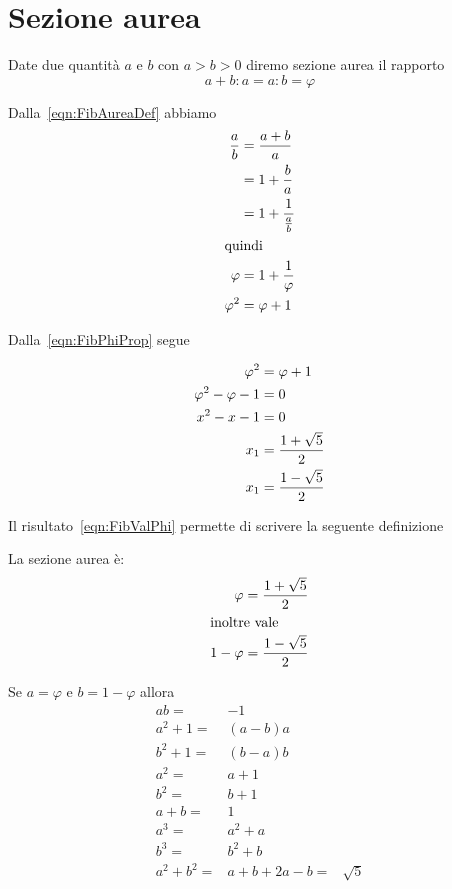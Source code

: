 \section{Sezione aurea}
\begin{defn}
	Date due quantità $a$ e $b$ con $a>b>0$ diremo sezione aurea il rapporto
	\begin{equation}
	a+b:a=a:b=\varphi	
	\end{equation}\label{eqn:FibAureaDef}
\end{defn}
\begin{prop}
	Dalla~\vref{eqn:FibAureaDef} abbiamo
	\begin{align}
		\dfrac{a}{b}={}&\dfrac{a+b}{a}\notag\\
		={}&1+\dfrac{b}{a}\notag\\
		={}&1+\dfrac{1}{\frac{a}{b}}\notag\\
		\intertext{quindi}
		\varphi={}&1+\dfrac{1}{\varphi}\label{eqn:FibPhiProp}\\
		\varphi^2={}&\varphi+1\notag
	\end{align}
\end{prop}
	Dalla~\vref{eqn:FibPhiProp} segue
	\begin{prop}
	\begin{align}
		\varphi^2={}&\varphi+1\notag\\
		\varphi^2-\varphi-1={}&0\notag\\
		x^2-x-1={}&0\label{eqn:FibValPhiEqua}\\
		x_1={}&\dfrac{1+\sqrt{5}}{2}\label{eqn:FibValPhi}\\
		x_1={}&\dfrac{1-\sqrt{5}}{2}\notag
	\end{align}
\end{prop}
Il risultato~\ref{eqn:FibValPhi} permette di scrivere la seguente definizione
\begin{defn}
La sezione aurea è: 
\begin{align*}
	\varphi={}&\dfrac{1+\sqrt{5}}{2}\\
\intertext{inoltre vale}
	1-	\varphi={}&\dfrac{1-\sqrt{5}}{2}\\
\end{align*}
\end{defn}
\begin{lem}[Proprietà]\label{lem:FibpropPhi}
	Se $a=\varphi$ e  $b=1-\varphi$ allora
	\begin{align*}
		ab={}&-1\\
		a^2+1={}&(a-b)a\\
		b^2+1={}&(b-a)b\\
		a^2={}&a+1\\
		b^2={}&b+1\\
		a+b={}&1\\
		a^3={}&a^2+a\\
		b^3={}&b^2+b\\
		a^2+b^2={}&a+b+2
	a-b={}&\sqrt{5}	
		\end{align*}
\end{lem}

